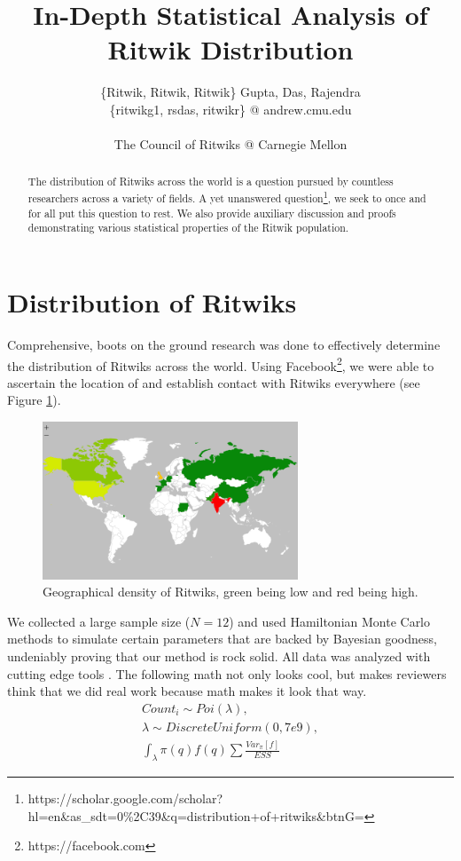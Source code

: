 \documentclass[]{article}
\title{In-Depth Statistical Analysis of Ritwik Distribution}
\author{\{Ritwik, Ritwik, Ritwik\} Gupta, Das, Rajendra
	\\
	\{ritwikg1, rsdas, ritwikr\} @ andrew.cmu.edu
	\\
	\\
	The Council of Ritwiks @ Carnegie Mellon}
\date{}
\begin{document}
\maketitle

\begin{abstract}
The distribution of Ritwiks across the world is a question pursued by countless researchers across a variety of fields. A yet unanswered question\footnote{https://scholar.google.com/scholar?hl=en\&as\_sdt=0\%2C39\&q=distribution+of+ritwiks\&btnG=}, we seek to once and for all put this question to rest. We also provide auxiliary discussion and proofs demonstrating various statistical properties of the Ritwik population.
\end{abstract}

\section{Distribution of Ritwiks}
Comprehensive, boots on the ground research was done to effectively determine the distribution of Ritwiks across the world. Using Facebook\footnote{https://facebook.com}, we were able to ascertain the location of and establish contact with Ritwiks everywhere (see Figure \ref{fig:ritwikgeographicaldistro}).
\begin{figure}[h]
	\centering
	\includegraphics[width=3in]{figures/RitwikGeographicalDistro}
	\caption{Geographical density of Ritwiks, green being low and red being high.}
	\label{fig:ritwikgeographicaldistro}
\end{figure}
We collected a large sample size ($N = 12$) and used Hamiltonian Monte Carlo methods to simulate certain parameters that are backed by Bayesian goodness, undeniably proving that our method is rock solid. All data was analyzed with cutting edge tools \cite{Zaharia:2012:RDD:2228298.2228301, PyMC3}. The following math not only looks cool, but makes reviewers think that we did real work because math makes it look that way.
\begin{subequations}
\begin{align}
Count_i \sim Poi(\lambda),\\
\lambda \sim DiscreteUniform(0, 7e9),\\
\int_{\lambda}\pi(q)f(q)\sum{\frac{Var_\pi[f]}{ESS}}
\end{align}
\end{subequations}
\vspace{1in}
\end{document}
